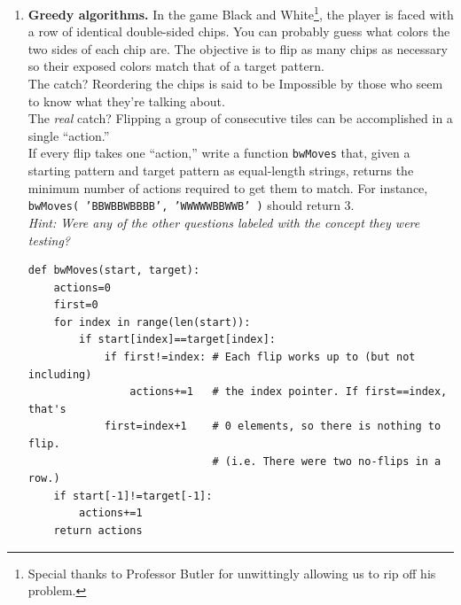 \documentclass[11pt]{article}
\newenvironment{answer}{\large\lstset{basicstyle=\tiny}\color{white}}{}
\newenvironment{answer}{\large\lstset{basicstyle=\large}\color{red}}{}
\begin{document}
\begin{enumerate}
\item
\textbf{Greedy algorithms.}
In the game Black and White\footnote{Special thanks to Professor Butler for unwittingly allowing us to rip off his problem.}, the player is faced with a row of identical double-sided chips.
You can probably guess what colors the two sides of each chip are.
The objective is to flip as many chips as necessary so their exposed colors match that of a target pattern. \\
The catch?
Reordering the chips is said to be Impossible by those who seem to know what they're talking about. \\
The \textit{real} catch?
Flipping a group of consecutive tiles can be accomplished in a single ``action.'' \\
If every flip takes one ``action,'' write a function \texttt{bwMoves} that, given a starting pattern and target pattern as equal-length strings, returns the minimum number of actions required to get them to match.
For instance, \texttt{bwMoves( 'BBWBBWBBBB', 'WWWWWBBWWB' )} should return 3.
\vspace{6pt} \\
\textit{Hint: Were any of the other questions labeled with the concept they were testing?}
\begin{answer}
\begin{lstlisting}
def bwMoves(start, target):
	actions=0
	first=0
	for index in range(len(start)):
		if start[index]==target[index]:
			if first!=index: # Each flip works up to (but not including)
				actions+=1	 # the index pointer. If first==index, that's
			first=index+1	 # 0 elements, so there is nothing to flip.
							 # (i.e. There were two no-flips in a row.)
	if start[-1]!=target[-1]:
		actions+=1
	return actions
\end{lstlisting}
\end{answer}

\end{enumerate}
\end{document}
